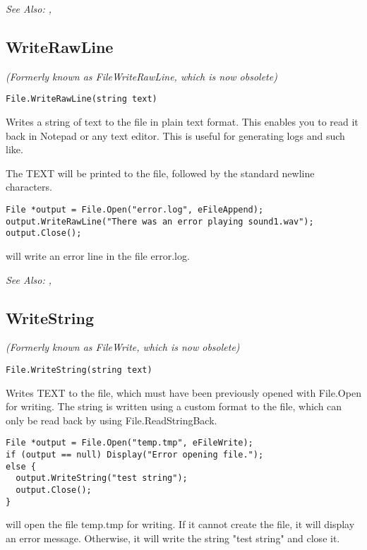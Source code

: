 \it{See Also:} , 


\subsection{WriteRawLine}\label{File.WriteRawLine}%

\it{(Formerly known as FileWriteRawLine, which is now obsolete)}

\begin{verbatim}
File.WriteRawLine(string text)
\end{verbatim}
Writes a string of text to the file in plain text format. This enables
you to read it back in Notepad or any text editor. This is useful for generating
logs and such like.

The TEXT will be printed to the file, followed by the standard newline characters.

\begin{verbatim}
File *output = File.Open("error.log", eFileAppend);
output.WriteRawLine("There was an error playing sound1.wav");
output.Close();
\end{verbatim}
will write an error line in the file error.log.

\it{See Also:} ,


\subsection{WriteString}\label{File.WriteString}%

\it{(Formerly known as FileWrite, which is now obsolete)}

\begin{verbatim}
File.WriteString(string text)
\end{verbatim}
Writes TEXT to the file, which must have been previously opened with
File.Open for writing. The string is written using a custom format to
the file, which can only be read back by using File.ReadStringBack.

\begin{verbatim}
File *output = File.Open("temp.tmp", eFileWrite);
if (output == null) Display("Error opening file.");
else {
  output.WriteString("test string");
  output.Close();
}
\end{verbatim}
will open the file temp.tmp for writing. If it cannot create the file, it will display
an error message. Otherwise, it will write the string "test string" and close it.

